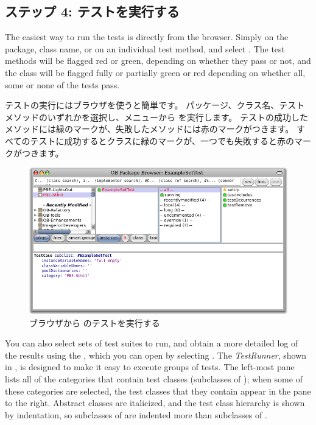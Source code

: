 \documentclass[a4paper,10pt,twoside]{book}
\begin{document}
\subsection{ステップ 4: テストを実行する}

The easiest way to run the tests is directly from the browser.  Simply \actclick on the package, class name, or on an individual test method, and select .
The test methods will be flagged red or green, depending on whether they pass or not, and the class will be flagged fully or partially green or red depending on whether all, some or none of the tests pass.
\fi

テストの実行にはブラウザを使うと簡単です。
パッケージ、クラス名、テストメソッドのいずれかを選択し、メニューから  を実行します。
テストの成功したメソッドには緑のマークが、失敗したメソッドには赤のマークがつきます。
すべてのテストに成功するとクラスに緑のマークが、一つでも失敗すると赤のマークがつきます。

\begin{figure}[tbh]
  \begin{center}
	\includegraphics[width=\linewidth]{browser-tests}
	\caption{ブラウザから \sunit のテストを実行する}
  \end{center}
\end{figure}


You can also select sets of test suites to run, and obtain a more detailed log of the results using the \sunit {}, which you can open by selecting .
The \emph{TestRunner}, shown in , is designed to make it easy  to execute groups of tests.
The left-most pane lists all of the categories that contain test classes (\ie  subclasses of ); when some of these categories are selected, the test classes that they contain appear in the pane to the right.
Abstract classes are italicized, and the test class hierarchy is shown by indentation, so subclasses of  are indented more than subclasses of .
\fi
\end{document}
